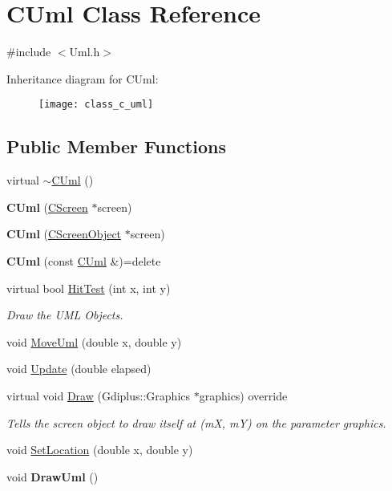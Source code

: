 \hypertarget{class_c_uml}{}\section{C\+Uml Class Reference}
\label{class_c_uml}


{\ttfamily \#include $<$Uml.\+h$>$}

Inheritance diagram for C\+Uml\+:\begin{figure}[H]
\begin{center}
\leavevmode
\texttt{[image: class\_c\_uml]}
\end{center}
\end{figure}
\subsection*{Public Member Functions}
\begin{DoxyCompactItemize}
\item 
virtual \mbox{\hyperlink{class_c_uml_ae973a18d9ff708dd9dfd26ba5d44061f}{$\sim$\+C\+Uml}} ()
\item 
\mbox{\label{class_c_uml_acecb04fe601ee46828985bb59176e9d8}} 
{\bfseries C\+Uml} (\mbox{\hyperlink{class_c_screen}{C\+Screen}} $\ast$screen)
\item 
\mbox{\label{class_c_uml_a278c4fa2802c1c2dfde8498ffb4a0cd5}} 
{\bfseries C\+Uml} (\mbox{\hyperlink{class_c_screen_object}{C\+Screen\+Object}} $\ast$screen)
\item 
\mbox{\label{class_c_uml_a4a9def91d5298fb1b3f524f5608d81c2}} 
{\bfseries C\+Uml} (const \mbox{\hyperlink{class_c_uml}{C\+Uml}} \&)=delete
\item 
virtual bool \mbox{\hyperlink{class_c_uml_a5f0281b47a5bb0ec6c4e6b9c83a7efd4}{Hit\+Test}} (int x, int y)
\begin{DoxyCompactList}\small\item\em Draw the U\+ML Objects. \end{DoxyCompactList}\item 
void \mbox{\hyperlink{class_c_uml_ac976ed21769ae13c888932a6e6239dd0}{Move\+Uml}} (double x, double y)
\item 
void \mbox{\hyperlink{class_c_uml_a5f8796cf4196fca70718e7bb7e21dfbf}{Update}} (double elapsed)
\item 
virtual void \mbox{\hyperlink{class_c_uml_a6c376484d055c37fdcc887eda97a61a3}{Draw}} (Gdiplus\+::\+Graphics $\ast$graphics) override
\begin{DoxyCompactList}\small\item\em Tells the screen object to draw itself at (mX, mY) on the parameter graphics. \end{DoxyCompactList}\item 
void \mbox{\hyperlink{class_c_uml_a435e42d85ab9cbe113931f4399d232dc}{Set\+Location}} (double x, double y)
\item 
\mbox{\label{class_c_uml_a08d1a1072dc648b855c349c26dbf978a}} 
void {\bfseries Draw\+Uml} ()
\end{DoxyCompactItemize}
